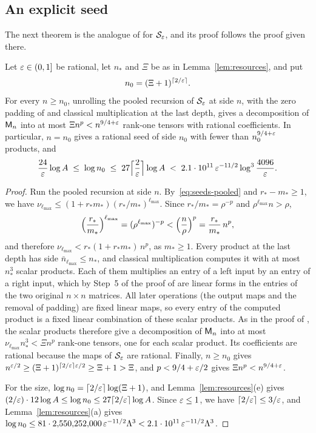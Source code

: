 \subsection{An explicit seed}
\label{sec:seeds-seed}

The next theorem is the analogue of \citep[Theorem~9.2]{FinCon26} for
\(\mathcal S_\varepsilon\), and its proof follows the proof given there.

\begin{theorem}\label{thm:seed}
Let \(\varepsilon\in(0,1]\) be rational, let \(n_*\) and \(\Xi\) be as in
Lemma~\ref{lem:resources}, and put
\[
 n_0=(\Xi+1)^{\lceil2/\varepsilon\rceil}.
\]
For every \(n\ge n_0\), unrolling the pooled recursion of
\(\mathcal S_\varepsilon\) at side \(n\), with the zero padding of
\citep[Lemma~2.4]{FinCon26} and classical multiplication at the last
depth, gives a decomposition of \(\mathsf M_n\) into at most
\(\Xi n^p<n^{9/4+\varepsilon}\) rank-one tensors with rational coefficients. In
particular, \(n=n_0\) gives a rational seed of side \(n_0\) with fewer
than \(n_0^{9/4+\varepsilon}\) products, and
\[
 \frac{24}{\varepsilon}\log A\;\le\;\log n_0\;\le\;
 27\Bigl\lceil\frac2{\varepsilon}\Bigr\rceil\log A
 \;<\;2.1\cdot10^{11}\,\varepsilon^{-11/2}\log^3\frac{4096}{\varepsilon} .
\]
\end{theorem}

\begin{proof}
Run the pooled recursion at side \(n\). By~\eqref{eq:seeds-pooled} and
\(r_*-m_*\ge1\), we have
\(\nu_{\ell_{\max}}\le(1+r_*m_*)(r_*/m_*)^{\ell_{\max}}\). Since
\(r_*/m_*=\rho^{-p}\) and \(\rho^{\ell_{\max}}n>\rho\),
\[
 \Bigl(\frac{r_*}{m_*}\Bigr)^{\ell_{\max}}=(\rho^{\ell_{\max}})^{-p}
 <\Bigl(\frac n\rho\Bigr)^p=\frac{r_*}{m_*}\,n^p,
\]
and therefore \(\nu_{\ell_{\max}}<r_*(1+r_*m_*)\,n^p\), as \(m_*\ge1\).
Every product at the last depth has side
\(\bar n_{\ell_{\max}}\le n_*\), and classical multiplication computes it
with at most \(n_*^3\) scalar products. Each of them multiplies an entry
of a left input by an entry of a right input, which by Step~5 of the proof
of \citep[Lemma~2.4]{FinCon26} are linear forms in the entries of the two
original \(n\times n\) matrices. All later operations (the output maps and
the removal of padding) are fixed linear maps, so every entry of the
computed product is a fixed linear combination of these scalar products.
As in the proof of \citep[Corollary~8.7]{FinCon26}, the scalar products
therefore give a decomposition of \(\mathsf M_n\) into at most
\(\nu_{\ell_{\max}}n_*^3<\Xi n^p\) rank-one tensors, one for each scalar
product. Its coefficients are rational because the maps of
\(\mathcal S_\varepsilon\) are rational. Finally, \(n\ge n_0\) gives
\(n^{\varepsilon/2}\ge(\Xi+1)^{\lceil2/\varepsilon\rceil\varepsilon/2}\ge\Xi+1>\Xi\), and
\(p<9/4+\varepsilon/2\) gives \(\Xi n^p<n^{9/4+\varepsilon}\).

For the size, \(\log n_0=\lceil2/\varepsilon\rceil\log(\Xi+1)\), and
Lemma~\ref{lem:resources}(e) gives
\((2/\varepsilon)\cdot12\log A\le\log n_0\le27\lceil2/\varepsilon\rceil\log A\). Since
\(\varepsilon\le1\), we have \(\lceil2/\varepsilon\rceil\le3/\varepsilon\), and
Lemma~\ref{lem:resources}(a) gives
\(\log n_0\le81\cdot2{,}550{,}252{,}000\,\varepsilon^{-11/2}\Lambda^3
<2.1\cdot10^{11}\,\varepsilon^{-11/2}\Lambda^3\).
\end{proof}

